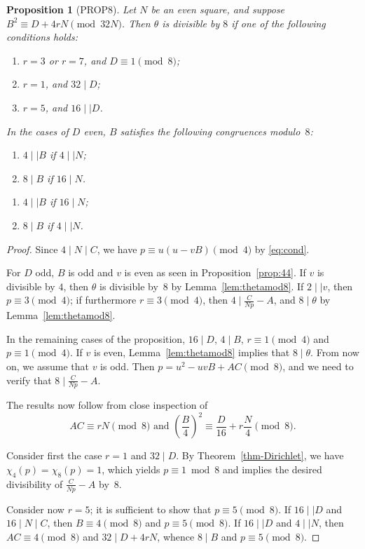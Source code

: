 \documentclass[12pt,twoside,leqno]{article}
\newtheorem{proposition}[theorem]{Proposition}
\numberwithin{equation}{section}
\newenvironment {alphenumerate}
   {\renewcommand {\labelenumi}{(\alph {enumi})}
    \renewcommand {\labelenumii}{(\alph {enumi}\arabic {enumii})}
    \begin {enumerate}}
   {\end {enumerate}}
\newenvironment {alpharabenumerate}[1][]
   {\renewcommand {\labelenumi}{(#1\arabic{enumi})}
    \begin {enumerate}}
   {\end {enumerate}}
\begin{document}
\begin{proposition}[PROP8]
Let $N$ be an even square, and suppose $B^2\equiv D+ 4 r N\pmod {32N}$.
Then $\theta$ is divisible by $8$ if one of the following conditions holds:
\begin {alphenumerate}
\item
$r=3$ or $r = 7$, and $D \equiv 1 \pmod 8$;
\item
$r=1$, and $32 \mid D$;
\item
$r=5$, and $16 \mid\mid D$.
\end {alphenumerate}
In the cases of $D$ even, $B$ satisfies the following congruences modulo~$8$:
\begin {alpharabenumerate}[b]
\item
$4 \mid\mid B$ if $4 \mid\mid N$;
\item
$8 \mid B$ if $16 \mid N$.
\end {alpharabenumerate}
\begin {alpharabenumerate}[c]
\item
$4 \mid\mid B$ if $16 \mid N$;
\item
$8 \mid B$ if $4 \mid\mid N$.
\end {alpharabenumerate}
\end{proposition}

\begin{proof}
Since $4 \mid N \mid C$, we have $p \equiv u (u - v B) \pmod 4$ by
\eqref {eq:cond}.

For $D$ odd, $B$ is odd and $v$ is even as seen in
Proposition~\ref {prop:44}. If $v$ is divisible by $4$, then
$\theta$ is divisible by~$8$ by Lemma~\ref {lem:thetamod8}. If
$2 \mid\mid v$, then $p \equiv 3 \pmod 4$; if furthermore $r \equiv 3 \pmod 4$,
then $4 \mid \frac {C}{N p} - A$, and $8 \mid \theta$ by
Lemma~\ref {lem:thetamod8}.

In the remaining cases of the proposition, $16 \mid D$, $4 \mid B$,
$r \equiv 1 \pmod 4$
and $p \equiv 1 \pmod 4$. If $v$ is even, Lemma~\ref {lem:thetamod8}
implies that $8 \mid \theta$. From now on, we assume that $v$ is odd.
Then $p = u^2 - u v B + A C \pmod 8$, and we need to verify that
$8 \mid \frac {C}{N p} - A$.

The results now follow from close inspection of
$$AC \equiv r N \pmod 8
\text { and }
\left( \frac {B}{4} \right)^2 \equiv \frac {D}{16} + r \frac {N}{4}
\pmod 8.$$

Consider first the case $r = 1$ and $32\mid D$. By
Theorem~\ref{thm-Dirichlet}, we have $\chi_4(p)=\chi_8(p)=1$,
which yields $p\equiv 1\bmod 8$ and implies the desired divisibility
of $\frac {C}{N p} - A$ by~$8$.

Consider now $r = 5$; it is sufficient to show that $p \equiv 5 \pmod 8$.
If $16 \mid\mid D$ and $16 \mid N \mid C$, then $B \equiv 4 \pmod 8$
and $p \equiv 5 \pmod 8$. If $16 \mid\mid D$ and $4 \mid\mid N$, then
$AC \equiv 4 \pmod 8$ and $32 \mid D + 4 r N$, whence $8 \mid B$ and
$p \equiv 5 \pmod 8$.
\end{proof}
\end{document}

